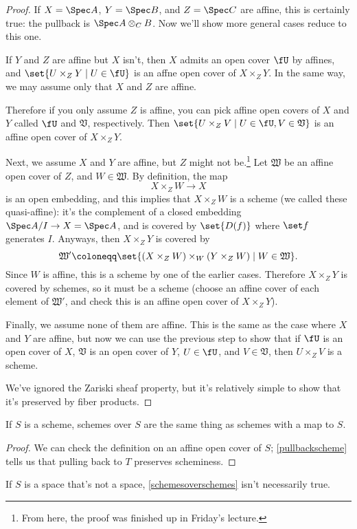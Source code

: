 \begin{proof}
If $X = \Spec A$, $Y = \Spec B$, and $Z = \Spec C$ are affine, this is certainly true: the pullback is $\Spec
A\otimes_C B$. Now we'll show more general cases reduce to this one.

If $Y$ and $Z$ are affine but $X$ isn't, then $X$ admits an open cover $\fU$ by affines, and $\set{U\times_Z Y\mid
U\in\fU}$ is an affne open cover of $X\times_Z Y$. In the same way, we may assume only that $X$ and $Z$ are affine.

Therefore if you only assume $Z$ is affine, you can pick affine open covers of $X$ and $Y$ called $\fU$ and
$\mathfrak V$, respectively. Then $\set{U\times_Z V\mid U\in\fU, V\in\mathfrak V}$ is an affine open cover of
$X\times_Z Y$.

Next, we assume $X$ and $Y$ are affine, but $Z$ might not be.\footnote{From here, the proof was finished up in
Friday's lecture.} Let $\mathfrak W$ be an affine open cover of $Z$, and $W\in\mathfrak W$. By definition, the map
\begin{equation}
	X\times_Z W\longrightarrow X
\end{equation}
is an open embedding, and this implies that $X\times_Z W$ is a scheme (we called these quasi-affine): it's the
complement of a closed embedding $\Spec A/I\to X = \Spec A$, and is covered by $\set{D(f)}$ where $\set f$
generates $I$. Anyways, then $X\times_Z Y$ is covered by
\begin{equation}
	\mathfrak W'\coloneqq \set{(X\times_Z W)\times_W (Y\times_Z W)\mid W\in\mathfrak W}.
\end{equation}
Since $W$ is affine, this is a scheme by one of the earlier cases. Therefore $X\times_Z Y$ is covered by schemes,
so it must be a scheme (choose an affine cover of each element of $\mathfrak W'$, and check this is an affine open
cover of $X\times_Z Y$).

Finally, we assume none of them are affine. This is the same as the case where $X$ and $Y$ are affine, but now we
can use the previous step to show that if $\fU$ is an open cover of $X$, $\mathfrak V$ is an open cover of $Y$,
$U\in\fU$, and $V\in\mathfrak V$, then $U\times_Z V$ is a scheme.

We've ignored the Zariski sheaf property, but it's relatively simple to show that it's preserved by fiber products.
\end{proof}
\begin{cor}
\label{schemesoverschemes}
If $S$ is a scheme, schemes over $S$ are the same thing as schemes with a map to $S$.
\end{cor}
\begin{proof}
We can check the definition on an affine open cover of $S$; \cref{pullbackscheme} tells us that pulling back to $T$
preserves scheminess.
\end{proof}
If $S$ is a space that's not a space, \cref{schemesoverschemes} isn't necessarily true.

